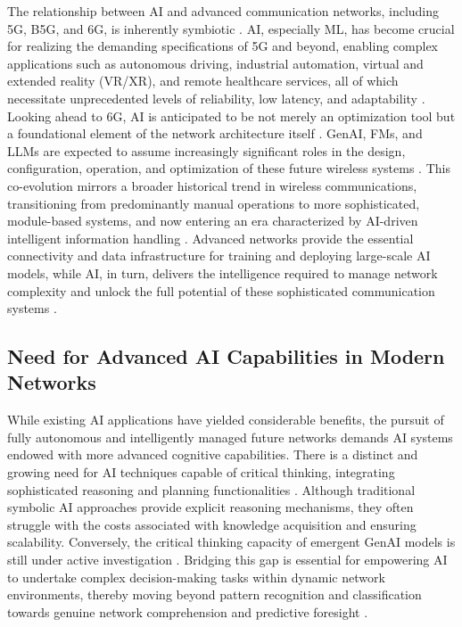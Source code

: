 \documentclass[sigconf]{acmart}
\begin{document}
The relationship between AI and advanced communication networks, including 5G, B5G, and 6G, is inherently symbiotic \cite{ref7}. AI, especially ML, has become crucial for realizing the demanding specifications of 5G and beyond, enabling complex applications such as autonomous driving, industrial automation, virtual and extended reality (VR/XR), and remote healthcare services, all of which necessitate unprecedented levels of reliability, low latency, and adaptability \cite{ref1}. Looking ahead to 6G, AI is anticipated to be not merely an optimization tool but a foundational element of the network architecture itself \cite{ref7, ref13, ref34}. GenAI, FMs, and LLMs are expected to assume increasingly significant roles in the design, configuration, operation, and optimization of these future wireless systems \cite{ref2, ref7, ref9, ref17}. This co-evolution mirrors a broader historical trend in wireless communications, transitioning from predominantly manual operations to more sophisticated, module-based systems, and now entering an era characterized by AI-driven intelligent information handling \cite{ref32}. Advanced networks provide the essential connectivity and data infrastructure for training and deploying large-scale AI models, while AI, in turn, delivers the intelligence required to manage network complexity and unlock the full potential of these sophisticated communication systems \cite{ref3, ref31}.

\subsection{Need for Advanced AI Capabilities in Modern Networks}
\label{sec:intro_need}

While existing AI applications have yielded considerable benefits, the pursuit of fully autonomous and intelligently managed future networks demands AI systems endowed with more advanced cognitive capabilities. There is a distinct and growing need for AI techniques capable of critical thinking, integrating sophisticated reasoning and planning functionalities \cite{ref6}. Although traditional symbolic AI approaches provide explicit reasoning mechanisms, they often struggle with the costs associated with knowledge acquisition and ensuring scalability. Conversely, the critical thinking capacity of emergent GenAI models is still under active investigation \cite{ref6}. Bridging this gap is essential for empowering AI to undertake complex decision-making tasks within dynamic network environments, thereby moving beyond pattern recognition and classification towards genuine network comprehension and predictive foresight \cite{ref6, ref35}.
\end{document}

